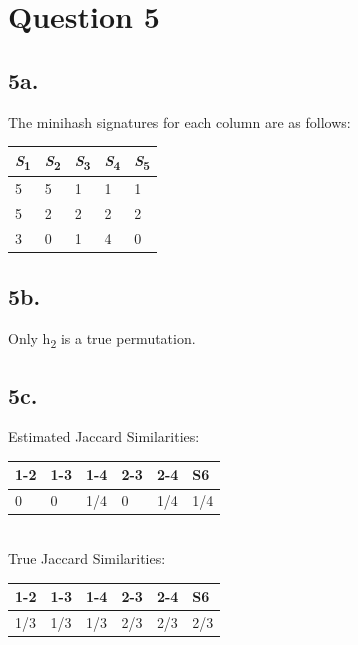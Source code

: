 \documentclass{article}
\begin{document}
\section{Question 5}

\subsection{5a.}
The minihash signatures for each column are as follows:

\begin{table}[h]
\begin{tabular}{|l|l|l|l|l|}
\hline
\textbf{\emph{S}\textsubscript{1}} & \textbf{\emph{S}\textsubscript{2}} & \textbf{\emph{S}\textsubscript{3}} & \textbf{\emph{S}\textsubscript{4}} & \textbf{\emph{S}\textsubscript{5}} \\ \hline
5           & 5           & 1           & 1           & 1           \\ \hline
5           & 2           & 2           & 2           & 2           \\ \hline
3           & 0           & 1           & 4           & 0           \\ \hline
\end{tabular}
\end{table}

\subsection{5b.}
Only h\textsubscript{2} is a true permutation.

\subsection{5c.}

Estimated Jaccard Similarities:
\begin{table}[h]
\begin{tabular}{|l|l|l|l|l|l|}
\hline
\textbf{1-2} & \textbf{1-3} & \textbf{1-4} & \textbf{2-3} & \textbf{2-4} & \textbf{S6} \\ \hline
0            & 0            & 1/4          & 0            & 1/4          & 1/4         \\ \hline
\end{tabular}
\end{table}\\
True Jaccard Similarities:
\begin{table}[h]
\begin{tabular}{|l|l|l|l|l|l|}
\hline
\textbf{1-2} & \textbf{1-3} & \textbf{1-4} & \textbf{2-3} & \textbf{2-4} & \textbf{S6} \\ \hline
1/3          & 1/3          & 1/3          & 2/3          & 2/3          & 2/3         \\ \hline
\end{tabular}
\end{table}
\end{document}
